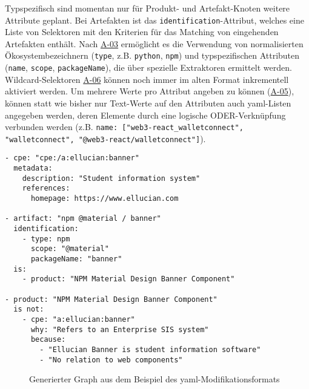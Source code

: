 Typspezifisch sind momentan nur für Produkt- und Artefakt-Knoten weitere Attribute geplant.
Bei Artefakten ist das \texttt{identification}-Attribut, welches eine Liste von Selektoren mit den Kriterien für das Matching von eingehenden Artefakten enthält.
Nach \hyperref[subsec:req-type-specific-matching]{A-03} ermöglicht es die Verwendung von normalisierten Ökosystembezeichnern (\texttt{type}, z.B. \texttt{python}, \texttt{npm}) und typspezifischen Attributen (\texttt{name}, \texttt{scope}, \texttt{packageName}), die über spezielle Extraktoren ermittelt werden.
Wildcard-Selektoren \hyperref[subsec:req-regex-support]{A-06} können noch immer im alten Format inkrementell aktiviert werden.
Um mehrere Werte pro Attribut angeben zu können (\hyperref[subsec:req-multiple-attribute-values]{A-05}), können statt wie bisher nur Text-Werte auf den Attributen auch \acrshort{yaml}-Listen angegeben werden, deren Elemente durch eine logische ODER-Verknüpfung verbunden werden (z.B. \texttt{name: ["web3-react\_walletconnect", "walletconnect", "@web3-react/walletconnect"]}).

\begin{lstlisting}[style=yaml,caption={Beispiel des \acrshort{yaml}-Modifikationsformats},label={lst:modell-graph-modification-yaml-demo},basicstyle=\ttfamily\scriptsize]
- cpe: "cpe:/a:ellucian:banner"
  metadata:
    description: "Student information system"
    references:
      homepage: https://www.ellucian.com

- artifact: "npm @material / banner"
  identification:
    - type: npm
      scope: "@material"
      packageName: "banner"
  is:
    - product: "NPM Material Design Banner Component"

- product: "NPM Material Design Banner Component"
  is not:
    - cpe: "a:ellucian:banner"
      why: "Refers to an Enterprise SIS system"
      because:
        - "Ellucian Banner is student information software"
        - "No relation to web components"
\end{lstlisting}

\begin{figure}[htbp]
    \centering
    \makebox[\textwidth]{}
    \caption{Generierter Graph aus dem Beispiel des \acrshort{yaml}-Modifikationsformats}
    \label{fig:modell-graph-modification-yaml-demo-rendered}
\end{figure}



